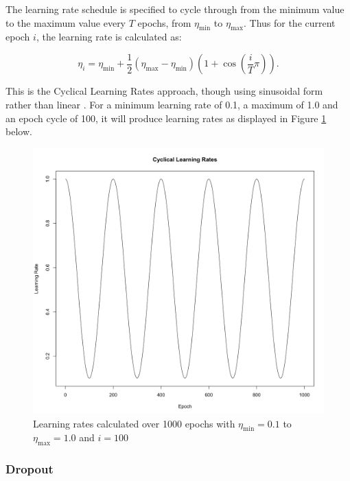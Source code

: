 \documentclass[a4paper,11pt,oneside]{article}
\theoremstyle{plain}
\theoremstyle{definition}
\begin{document}
	The learning rate schedule is specified to cycle through from the minimum value to the maximum value every $T$ epochs, from $\eta_{\min}$ to $\eta_{\max}$. Thus for the current epoch $i$, the learning rate is calculated as:
	
	\begin{equation}\label{func_learning_rate_sched}
	\eta_{i}=\eta_{\min }+\frac{1}{2}\left(\eta_{\max }-\eta_{\min }\right)\left(1+\cos \left(\frac{i}{T} \pi\right)\right) .
	\end{equation}
	
	This is the Cyclical Learning Rates approach, though using sinusoidal form rather than linear \citep{Smith}. For a minimum learning rate of 0.1, a maximum of 1.0 and an epoch cycle of 100, it will produce learning rates as displayed in Figure \ref{figure-SGDRLearningRates} below.
	
	\begin{figure}[H]
		\centering
		\includegraphics[scale=0.2]{images/implementation/CyclicalLearningRates.png}
		\caption[Cyclical Learning Rate Diagram]{Learning rates calculated over 1000 epochs with $\eta_{\min} = 0.1$ to $\eta_{\max} = 1.0$ and $i=100$}
		\label{figure-SGDRLearningRates}
	\end{figure}
	
	\subsubsection{Dropout}\label{imp_dropout}
	
\end{document}
